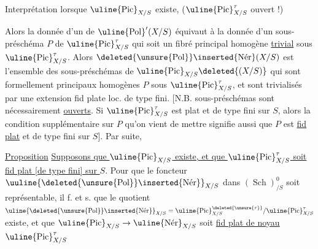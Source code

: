 Interprétation lorsque $\uline{\operatorname{Pic}}_{X/S}$ existe, ($\uline{\operatorname{Pic}}^{\tau}_{X/S}$ ouvert !)

Alors la donnée d'un  de $\uline{\operatorname{Pol}}'(X/S)$ équivaut à la donnée d'un sous-préschéma  $P$ de $\uline{\operatorname{Pic}}^{\tau}_{X/S}$ qui soit un fibré principal homogène \uline{trivial} sous $\uline{\operatorname{Pic}}^{\tau}_{X/S}$. Alors $\deleted{\unsure{\operatorname{Pol}}}\inserted{\operatorname{N\acute{e}r}}(X/S)$ est l'ensemble des sous-préschémas  de $\uline{\operatorname{Pic}}_{X/S}\deleted{(X/S)}$ qui sont formellement principaux homogènes $P$ sous $\uline{\operatorname{Pic}}^{\tau}_{X/S}$, et sont trivialisés par une extension fid plate loc. de type fini. [N.B.  sous-préschémas sont nécessairement \uline{ouverts}. Si $\uline{\operatorname{Pic}}^{\tau}_{X/S}$ est plat et de type fini sur $S$, alors la condition supplémentaire sur $P$ qu'on vient de mettre signifie aussi que $P$ est \uline{fid plat} et de type fini sur $S$]. Par suite,


\uline{Proposition} \uline{Supposons que $\uline{\operatorname{Pic}}_{X/S}$ existe, et que $\uline{\operatorname{Pic}}^{\tau}_{X/S}$ soit fid plat [de type fini] sur $S$}. Pour que le foncteur $\uuline{\deleted{\unsure{\operatorname{Pol}}}\inserted{\operatorname{N\acute{e}r}}}_{X/S}$ dans  $(\operatorname{Sch})^0_{/S}$ soit représentable, il f. et s. que le quotient $\uline{\deleted{\unsure{\operatorname{Pol}}}\inserted{\operatorname{N\acute{e}r}}}_{X/S}=\uline{\operatorname{Pic}}^{\deleted{\unsure{\tau}}}_{X/S}/\uline{\operatorname{Pic}}^{\tau}_{X/S}$ existe, et  que $\uline{\operatorname{Pic}}_{X/S}\to\uline{\operatorname{N\acute{e}r}}_{X/S}$ soit \uline{fid plat   de noyau $\uline{\operatorname{Pic}}^{\tau}_{X/S}$}
